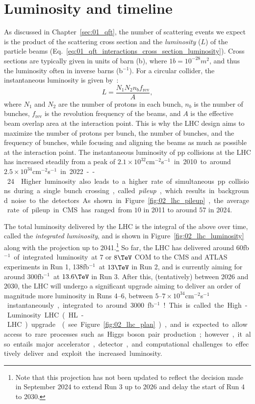 \section{Luminosity and timeline}
\label{sec:02_lhc_luminosity}

As discussed in Chapter~\ref{sec:01_qft}, the number of scattering events we expect is the product of the scattering cross section and the \textit{luminosity} ($L$) of the particle beams (Eq.~\ref{eq:01_qft_interactions_cross_section_luminosity}).
Cross sections are typically given in units of barn (b), where $1\unit{b} = 10^{-28}\unit{m}^2$, and thus the luminosity often in inverse barns (b$^{-1}$).
For a circular collider, the instantaneous luminosity is given by~\cite{Bruning:2012zz}:
\begin{equation}
    \label{eq:02_lhc_luminosity}
    L = \frac{N_1 N_2 n_b f_{\mathrm{rev}}}{A},
\end{equation}
where $N_1$ and $N_2$ are the number of protons in each bunch, $n_b$ is the number of bunches, $f_{\mathrm{rev}}$ is the revolution frequency of the beams, and $A$ is the effective beam overlap area at the interaction point.
This is why the LHC design aims to maximize the number of protons per bunch, the number of bunches, and the frequency of bunches, while focusing and aligning the beams as much as possible at the interaction point.
The instantaneous luminosity of pp collisions at the LHC has increased steadily from a peak of $2.1\times10^{32}$\unit{cm$^{-2}$s$^{-1}$} in 2010 to around $2.5\times10^{34}$\unit{cm$^{-2}$s$^{-1}$} in 2022--24~\cite{cmslumi2024}.
Higher luminosity also leads to a higher rate of simultaneous pp collisions during a single bunch crossing, called \textit{pileup}, which results in background noise to the detectors.
As shown in Figure~\ref{fig:02_lhc_pileup}, the average rate of pileup in CMS has ranged from $10$ in 2011 to around $57$ in 2024.

The total luminosity delivered by the LHC is the integral of the above over time, called the \textit{integrated luminosity}, and is shown in Figure~\ref{fig:02_lhc_luminosity} along with the projection up to 2041.\footnote{Note that this projection has not been updated to reflect the decision made in September 2024 to extend Run 3 up to 2026 and delay the start of Run 4 to 2030.}
So far, the LHC has delivered around 60\unit{fb$^{-1}$} of integrated luminosity at $7$ or $8\TeV$ COM to the CMS and ATLAS experiments in Run 1, 138\unit{fb$^{-1}$} at $13\TeV$ in Run 2, and is currently aiming for around 300\unit{fb$^{-1}$} at $13.6\TeV$ in Run 3.
After this, (tentatively) between 2026 and 2030, the LHC will undergo a significant upgrade aiming to deliver an order of magnitude more luminosity in Runs 4--6, between $5$--$7\times10^{34}$\unit{cm$^{-2}$s$^{-1}$} instantaneously, integrated to around 3000\unit{fb$^{-1}$}!
This is called the High-Luminosity LHC (HL-LHC) upgrade~\cite{HL-LHC} (see Figure~\ref{fig:02_lhc_plan}), and is expected to allow access to rare processes such as Higgs boson pair production; however, it also entails major accelerator, detector, and computational challenges to effectively deliver and exploit the increased luminosity.

